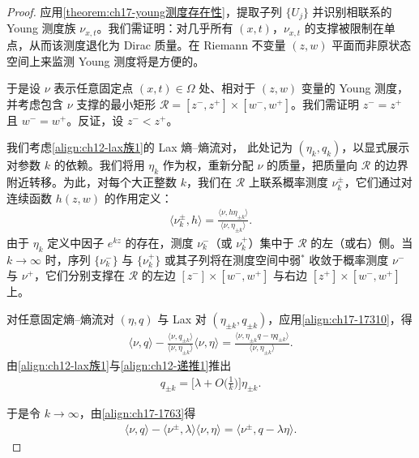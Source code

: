 \documentclass[../../main.tex]{subfiles}
\begin{document}
\begin{proof}
应用\cref{theorem:ch17-young测度存在性}，提取子列 $\{U_j\}$ 并识别相联系的 Young 测度族 $\nu_{x,t}$。我们需证明：对几乎所有 $(x,t)$，$\nu_{x,t}$ 的支撑被限制在单点，从而该测度退化为 Dirac 质量。在 Riemann 不变量 $(z,w)$ 平面而非原状态空间上来监测 Young 测度将是方便的。

于是设 $\nu$ 表示任意固定点 $(x,t)\in\Omega$ 处、相对于 $(z,w)$ 变量的 Young 测度，并考虑包含 $\nu$ 支撑的最小矩形 $\mathscr{R}=[z^-,z^+]\times[w^-,w^+]$。我们需证明 $z^-=z^+$ 且 $w^-=w^+$。反证，设 $z^-<z^+$。

我们考虑\eqref{align:ch12-lax族1}的 Lax 熵--熵流对，
此处记为 $(\eta_k,q_k)$，以显式展示对参数 $k$ 的依赖。我们将用 $\eta_k$ 作为权，重新分配 $\nu$ 的质量，把质量向 $\mathscr{R}$ 的边界附近转移。为此，对每个大正整数 $k$，我们在 $\mathscr{R}$ 上联系概率测度 $\nu_k^\pm$，它们通过对连续函数 $h(z,w)$ 的作用定义：
\begin{align}
\langle\nu_k^\pm,h\rangle=\frac{\langle\nu,h\eta_{\pm k}\rangle}{\langle\nu,\eta_{\pm k}\rangle}.
\label{align:ch17-1762}
\end{align}
由于 $\eta_k$ 定义中因子 $e^{kz}$ 的存在，测度 $\nu_k^-$（或 $\nu_k^+$）集中于 $\mathscr{R}$ 的左（或右）侧。当 $k\to\infty$ 时，序列 $\{\nu_k^-\}$ 与 $\{\nu_k^+\}$ 或其子列将在测度空间中弱$^*$ 收敛于概率测度 $\nu^-$ 与 $\nu^+$，它们分别支撑在 $\mathscr{R}$ 的左边 $[z^-]\times[w^-,w^+]$ 与右边 $[z^+]\times[w^-,w^+]$ 上。

对任意固定熵--熵流对 $(\eta,q)$ 与 Lax 对 $(\eta_{\pm k},q_{\pm k})$，应用\eqref{align:ch17-17310}，得
\begin{align}
\langle\nu,q\rangle-\frac{\langle\nu,q_{\pm k}\rangle}{\langle\nu,\eta_{\pm k}\rangle}\langle\nu,\eta\rangle=\frac{\langle\nu,\eta_{\pm k}q-\eta q_{\pm k}\rangle}{\langle\nu,\eta_{\pm k}\rangle}.
\label{align:ch17-1763}
\end{align}
由\eqref{align:ch12-lax族1}与\eqref{align:ch12-递推1}推出
\begin{align}
q_{\pm k}=\bigl[\lambda+O\bigl(\tfrac{1}{k}\bigr)\bigr]\eta_{\pm k}.
\label{align:ch17-1764}
\end{align}

于是令 $k\to\infty$，由\eqref{align:ch17-1763}得
\begin{align}
\langle\nu,q\rangle-\langle\nu^\pm,\lambda\rangle\langle\nu,\eta\rangle=\langle\nu^\pm,q-\lambda\eta\rangle.
\label{align:ch17-1765}
\end{align}


\end{proof}
\end{document}
